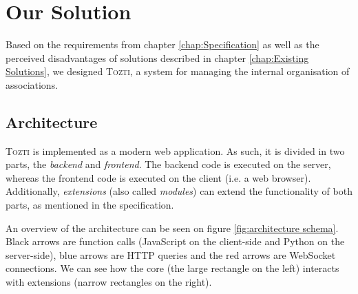 \documentclass[a4paper, english]{report}
\newcommand{\tozti}{\textsc{Tozti}\xspace}
\begin{document}
\chapter{Our Solution} %
Based on the requirements from chapter \ref{chap:Specification} as well as the perceived disadvantages of solutions described in chapter \ref{chap:Existing Solutions}, we designed \tozti, a system for managing the internal organisation of associations. 

\section{Architecture}
\tozti is implemented as a modern web application. As such, it is divided in two parts, the \emph{backend} and \emph{frontend}. The backend code is executed on the server, whereas the frontend code is executed on the client (i.e. a web browser). Additionally, \emph{extensions} (also called \emph{modules}) can extend the functionality of both parts, as mentioned in the specification.

An overview of the architecture can be seen on figure \ref{fig:architecture schema}. Black arrows are function calls (JavaScript on the client-side and Python on the server-side), blue arrows are HTTP queries and the red arrows are WebSocket connections. We can see how the core (the large rectangle on the left) interacts with extensions (narrow rectangles on the right).
\end{document}
